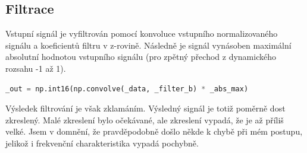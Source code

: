 \documentclass{article}
\begin{document}
\subsection{Filtrace}
\begin{flushleft}
    Vstupní signál je vyfiltrován pomocí konvoluce vstupního normalizovaného signálu 
    a koeficientů filtru v z-rovině.
    Následně je signál vynásoben maximální absolutní hodnotou vstupního signálu 
    (pro zpětný přechod z dynamického rozsahu -1 až 1).
\begin{lstlisting}[language=Python, caption={Filtrování}]
_out = np.int16(np.convolve(_data, _filter_b) * _abs_max)
\end{lstlisting}
    Výsledek filtrování je však zklamáním. Výsledný signál je totiž poměrně dost zkreslený.
    Malé zkreslení bylo očekávané, ale zkreslení vypadá, že je až příliš velké. 
    Jsem v domnění, že pravděpodobně došlo někde k chybě při mém postupu, 
    jelikož i frekvenční charakteristika vypadá pochybně.

\end{flushleft}

\begin{lstlisting}[language=Python, caption={}]
\end{lstlisting}
\end{document}
